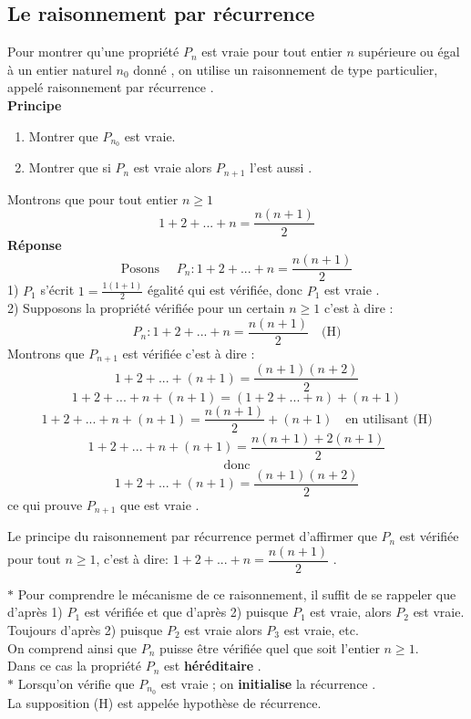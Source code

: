 \subsection{Le raisonnement par récurrence}
Pour montrer qu'une propriété $ P_{n} $ est vraie pour tout entier $ n $ supérieure ou égal à un entier naturel $ n_{0} $ donné , on utilise un raisonnement de type particulier, appelé raisonnement par récurrence .\\
\textbf{Principe}
\begin{enumerate} 
\item  Montrer que $ P_{n_{0}} $  est vraie.
\item  Montrer que si $ P_{n} $ est vraie  alors $ P_{n+1} $ l'est aussi .
 \end{enumerate}
\begin{example}
Montrons que pour tout entier $ n\geq 1 $  \[1+2+ ...+ n = \frac{n(n+1)}{2}\]
\textbf{Réponse} 
  $$ \textrm{Posons } \quad P_{n}: 1+2+ ...+ n = \frac{n(n+1)}{2} $$
1) $ P_{1} $ s'écrit $ 1= \frac{1(1+1)}{2} $  égalité qui est vérifiée, donc $  P_{1} $  est vraie . \\
2) Supposons la propriété vérifiée pour un certain $ n\geq 1 $ c'est à dire :
$$ P_{n}: 1+2+ ...+ n = \frac{n(n+1)}{2} \quad \textrm{(H)}  $$
Montrons que $ P_{n+1} $  est vérifiée c'est à dire :
$$  1+2+ ...+ (n+1 )= \frac{(n+1)(n+2)}{2} $$
 $$  1+2+ ...+ n + (n+1)=( 1+2+ ...+ n )+ (n+1)$$
  $$  1+2+ ...+ n + (n+1)= \frac{n(n+1)}{2}+ (n+1)\quad  \textrm{en utilisant (H)}$$
  $$1+2+ ...+ n + (n+1)= \frac{n(n+1)+2(n+1)}{2}$$   $$\textrm{donc}$$
  $$1+2+ ...+ (n+1 )= \frac{(n+1)(n+2)}{2}$$
  ce qui prouve $ P_{n+1} $ que est vraie .
  \end{example}
  Le principe du raisonnement par récurrence permet d'affirmer que $ P_{n} $ est vérifiée pour tout $ n\geq 1 $, c'est à dire: 
  $ 1+2+ ...+ n = \dfrac{n(n+1)}{2}$ .
   \begin{remark}
   
  $ \ast $ Pour comprendre le mécanisme de ce raisonnement, il suffit de se rappeler que d'après 1) $ P_{1} $ est vérifiée et que d'après 2) puisque $P_{1}$ est vraie, alors $ P_{2} $ est vraie.\\
Toujours d'après 2) puisque $ P_{2} $ est vraie alors $ P_{3} $ est vraie, etc.\\
On comprend ainsi que $ P_{n} $ puisse être  vérifiée quel que soit l'entier $n\geq 1$.\\ Dans ce cas la propriété $ P_{n}$ est   \textbf{héréditaire }.\\
$ \ast $ Lorsqu'on vérifie que  $ P_{n_{0}} $  est vraie ; on  \textbf{initialise} la récurrence . \\
La supposition  (H) est  appelée hypothèse de récurrence. 
\end{remark}   
